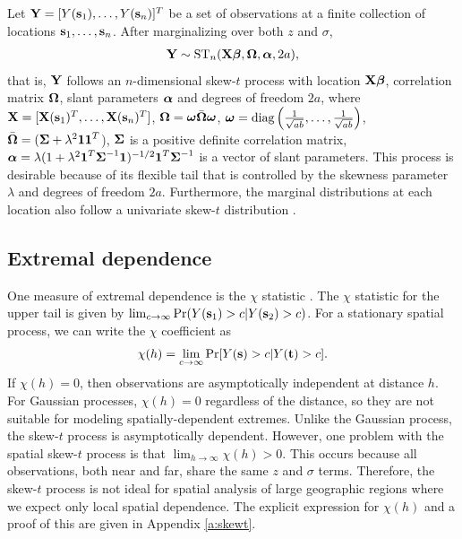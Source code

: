\documentclass[11pt]{article}
\begin{document}
Let $\mbox{\bf Y} = [Y(\mbox{\bf s}_1), \ldots, Y(\mbox{\bf s}_n)]^T$ be a set of observations at a finite collection of locations $\mbox{\bf s}_1, \ldots, \mbox{\bf s}_n$.
After marginalizing over both $z$ and $\sigma$,
\begin{align}
  \mbox{\bf Y} \sim \text{ST}_n(\mbox{\bf X} \mbox{\boldmath $\beta$}, \mbox{\boldmath $\Omega$}, \mbox{\boldmath $\alpha$}, 2a), \label{eq:fullmodel}
\end{align}
that is, $\mbox{\bf Y}$ follows an $n$-dimensional skew-$t$ process with location $\mbox{\bf X} \mbox{\boldmath $\beta$}$, correlation matrix $\mbox{\boldmath $\Omega$}$, slant parameters $\mbox{\boldmath $\alpha$}$ and degrees of freedom $2a$, where $\mbox{\bf X} = [\mbox{\bf X}(\mbox{\bf s}_1)^T, \ldots, \mbox{\bf X}(\mbox{\bf s}_n)^T]$, $\mbox{\boldmath $\Omega$} = \mbox{\boldmath $\omega$} \bar{\mbox{\boldmath $\Omega$}} \mbox{\boldmath $\omega$}$, $\mbox{\boldmath $\omega$} = \text{diag}\left(\frac{1}{ \sqrt{ab}}, \ldots, \frac{1}{\sqrt{ab}}\right)$, $\bar{\mbox{\boldmath $\Omega$}} = (\mbox{\boldmath $\Sigma$} + \lambda^2 \mbox{\boldmath $1$} \mbox{\boldmath $1$}^T$), $\mbox{\boldmath $\Sigma$}$ is a positive definite correlation matrix, $\mbox{\boldmath $\alpha$} = \lambda (1 + \lambda^2 \mbox{\boldmath $1$}^T \mbox{\boldmath $\Sigma$}^{-1} \mbox{\boldmath $1$})^{-1/2} \mbox{\boldmath $1$}^T \mbox{\boldmath $\Sigma$}^{-1}$ is a vector of slant parameters.
This process is desirable because of its flexible tail that is controlled by the skewness parameter $\lambda$ and degrees of freedom $2a$.
Furthermore, the marginal distributions at each location also follow a univariate skew-$t$ distribution \citep{Azzalini2013}.

\subsection{Extremal dependence}
One measure of extremal dependence is the $\chi$ statistic \citep{Padoan2011}.
The $\chi$ statistic for the upper tail is given by $\lim_{c \rightarrow \infty} \Pr(Y(\mbox{\bf s}_1) > c | Y(\mbox{\bf s}_2) > c)$.
For a stationary spatial process, we can write the $\chi$ coefficient as
\begin{align}
  \chi(h) = \lim_{c \rightarrow \infty} \Pr[Y(\mbox{\bf s}) > c | Y(\mbox{\bf t}) > c].
\end{align}
If $\chi(h) = 0$, then observations are asymptotically independent at distance $h$.
For Gaussian processes, $\chi(h) = 0$ regardless of the distance, so they are not suitable for modeling spatially-dependent extremes.
Unlike the Gaussian process, the skew-$t$ process is asymptotically dependent.
However, one problem with the spatial skew-$t$ process is that $\lim_{h \rightarrow \infty} \chi(h) > 0$.
This occurs because all observations, both near and far, share the same $z$ and $\sigma$ terms.
Therefore, the skew-$t$ process is not ideal for spatial analysis of large geographic regions where we expect only local spatial dependence.
The explicit expression for $\chi(h)$ \citep{Padoan2011} and a proof of this are given in Appendix \ref{a:skewt}.
\end{document}
